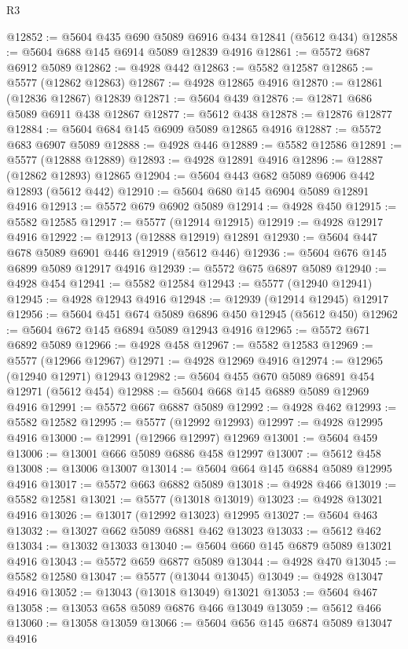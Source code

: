 \begin{lexlean}{R3}
\begin{coremodule}
@12852 := @5604 @435 @690 @5089 @6916 @434 @12841 (@5612 @434)
@12858 := @5604 @688 @145 @6914 @5089 @12839 @4916
@12861 := @5572 @687 @6912 @5089
@12862 := @4928 @442
@12863 := @5582 @12587
@12865 := @5577 (@12862 @12863)
@12867 := @4928 @12865 @4916
@12870 := @12861 (@12836 @12867) @12839
@12871 := @5604 @439
@12876 := @12871 @686 @5089 @6911 @438 @12867
@12877 := @5612 @438
@12878 := @12876 @12877
@12884 := @5604 @684 @145 @6909 @5089 @12865 @4916
@12887 := @5572 @683 @6907 @5089
@12888 := @4928 @446
@12889 := @5582 @12586
@12891 := @5577 (@12888 @12889)
@12893 := @4928 @12891 @4916
@12896 := @12887 (@12862 @12893) @12865
@12904 := @5604 @443 @682 @5089 @6906 @442 @12893 (@5612 @442)
@12910 := @5604 @680 @145 @6904 @5089 @12891 @4916
@12913 := @5572 @679 @6902 @5089
@12914 := @4928 @450
@12915 := @5582 @12585
@12917 := @5577 (@12914 @12915)
@12919 := @4928 @12917 @4916
@12922 := @12913 (@12888 @12919) @12891
@12930 := @5604 @447 @678 @5089 @6901 @446 @12919 (@5612 @446)
@12936 := @5604 @676 @145 @6899 @5089 @12917 @4916
@12939 := @5572 @675 @6897 @5089
@12940 := @4928 @454
@12941 := @5582 @12584
@12943 := @5577 (@12940 @12941)
@12945 := @4928 @12943 @4916
@12948 := @12939 (@12914 @12945) @12917
@12956 := @5604 @451 @674 @5089 @6896 @450 @12945 (@5612 @450)
@12962 := @5604 @672 @145 @6894 @5089 @12943 @4916
@12965 := @5572 @671 @6892 @5089
@12966 := @4928 @458
@12967 := @5582 @12583
@12969 := @5577 (@12966 @12967)
@12971 := @4928 @12969 @4916
@12974 := @12965 (@12940 @12971) @12943
@12982 := @5604 @455 @670 @5089 @6891 @454 @12971 (@5612 @454)
@12988 := @5604 @668 @145 @6889 @5089 @12969 @4916
@12991 := @5572 @667 @6887 @5089
@12992 := @4928 @462
@12993 := @5582 @12582
@12995 := @5577 (@12992 @12993)
@12997 := @4928 @12995 @4916
@13000 := @12991 (@12966 @12997) @12969
@13001 := @5604 @459
@13006 := @13001 @666 @5089 @6886 @458 @12997
@13007 := @5612 @458
@13008 := @13006 @13007
@13014 := @5604 @664 @145 @6884 @5089 @12995 @4916
@13017 := @5572 @663 @6882 @5089
@13018 := @4928 @466
@13019 := @5582 @12581
@13021 := @5577 (@13018 @13019)
@13023 := @4928 @13021 @4916
@13026 := @13017 (@12992 @13023) @12995
@13027 := @5604 @463
@13032 := @13027 @662 @5089 @6881 @462 @13023
@13033 := @5612 @462
@13034 := @13032 @13033
@13040 := @5604 @660 @145 @6879 @5089 @13021 @4916
@13043 := @5572 @659 @6877 @5089
@13044 := @4928 @470
@13045 := @5582 @12580
@13047 := @5577 (@13044 @13045)
@13049 := @4928 @13047 @4916
@13052 := @13043 (@13018 @13049) @13021
@13053 := @5604 @467
@13058 := @13053 @658 @5089 @6876 @466 @13049
@13059 := @5612 @466
@13060 := @13058 @13059
@13066 := @5604 @656 @145 @6874 @5089 @13047 @4916

\end{coremodule}
\end{lexlean}
